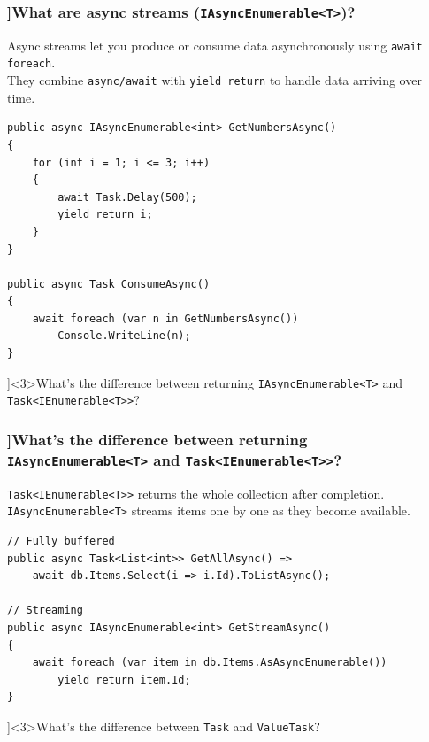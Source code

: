 \begin{frame}[fragile]
  \frametitle{\AnswerTitle[\CategoryBadge[OOPColor!20]{C\#} ]{What are async streams (\texttt{IAsyncEnumerable<T>})?}}

  {\footnotesize
  Async streams let you produce or consume data asynchronously using \texttt{await foreach}.\\
  They combine \texttt{async/await} with \texttt{yield return} to handle data arriving over time.
  }

  \begin{verbatim}
public async IAsyncEnumerable<int> GetNumbersAsync()
{
    for (int i = 1; i <= 3; i++)
    {
        await Task.Delay(500);
        yield return i;
    }
}

public async Task ConsumeAsync()
{
    await foreach (var n in GetNumbersAsync())
        Console.WriteLine(n);
}
  \end{verbatim}
\end{frame}

\QuestionSlide[\CategoryBadge[PerfColor!20]{Async \& Threading}]<3>{What's the difference between returning \texttt{IAsyncEnumerable<T>} and \texttt{Task<IEnumerable<T>>}?}

\begin{frame}[fragile]
  \frametitle{\AnswerTitle[\CategoryBadge[OOPColor!20]{C\#} ]{What's the difference between returning \texttt{IAsyncEnumerable<T>} and \texttt{Task<IEnumerable<T>>}?}}

  {\footnotesize
  \texttt{Task<IEnumerable<T>>} returns the whole collection after completion.\\
  \texttt{IAsyncEnumerable<T>} streams items one by one as they become available.
  }

  \begin{verbatim}
// Fully buffered
public async Task<List<int>> GetAllAsync() =>
    await db.Items.Select(i => i.Id).ToListAsync();

// Streaming
public async IAsyncEnumerable<int> GetStreamAsync()
{
    await foreach (var item in db.Items.AsAsyncEnumerable())
        yield return item.Id;
}
  \end{verbatim}
\end{frame}

\QuestionSlide[\CategoryBadge[PerfColor!20]{Async \& Threading}]<3>{What's the difference between \texttt{Task} and \texttt{ValueTask}?}

